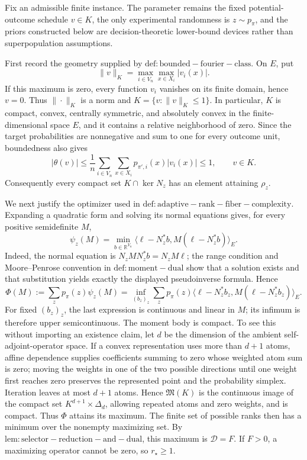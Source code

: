 Fix an admissible finite instance. The parameter remains the fixed potential-outcome schedule \(v\in K\), the only experimental randomness is \(z\sim p_{\pi}\), and the priors constructed below are decision-theoretic lower-bound devices rather than superpopulation assumptions.

First record the geometry supplied by \(\mathrm{def:bounded-fourier-class}\). On \(E\), put
\[
 \|v\|_K=\max_{i\in V_n}\max_{x\in X_i}|v_i(x)|.
\]
If this maximum is zero, every function \(v_i\) vanishes on its finite domain, hence \(v=0\). Thus \(\|\cdot\|_K\) is a norm and \(K=\{v:\|v\|_K\le1\}\). In particular, \(K\) is compact, convex, centrally symmetric, and absolutely convex in the finite-dimensional space \(E\), and it contains a relative neighborhood of zero. Since the target probabilities are nonnegative and sum to one for every outcome unit, boundedness also gives
\[
 |\theta(v)|
 \le \frac1n\sum_{i\in V_n}\sum_{x\in X_i}p_{\pi',i}(x)|v_i(x)|
 \le1,
 \qquad v\in K.
\]
Consequently every compact set \(K\cap\ker N_z\) has an element attaining \(\rho_z\).

We next justify the optimizer used in \(\mathrm{def:adaptive-rank-fiber-complexity}\). Expanding a quadratic form and solving its normal equations gives, for every positive semidefinite \(M\),
\[
 \psi_z(M)
 =\min_{b\in\mathbb R^{V_n}}
 \langle\ell-N_z^{\ast}b,M(\ell-N_z^{\ast}b)\rangle_E.
\]
Indeed, the normal equation is
\(N_zMN_z^{\ast}b=N_zM\ell\); the range condition and Moore--Penrose convention in \(\mathrm{def:moment-dual}\) show that a solution exists and that substitution yields exactly the displayed pseudoinverse formula. Hence
\[
 \Phi(M):=\sum_zp_{\pi}(z)\psi_z(M)
 =\inf_{(b_z)_z}\sum_zp_{\pi}(z)
 \langle\ell-N_z^{\ast}b_z,M(\ell-N_z^{\ast}b_z)\rangle_E.
\]
For fixed \((b_z)_z\), the last expression is continuous and linear in \(M\); its infimum is therefore upper semicontinuous. The moment body is compact. To see this without importing an existence claim, let \(d\) be the dimension of the ambient self-adjoint-operator space. If a convex representation uses more than \(d+1\) atoms, affine dependence supplies coefficients summing to zero whose weighted atom sum is zero; moving the weights in one of the two possible directions until one weight first reaches zero preserves the represented point and the probability simplex. Iteration leaves at most \(d+1\) atoms. Hence \(\mathfrak M(K)\) is the continuous image of the compact set \(K^{d+1}\times\Delta_d\), allowing repeated atoms and zero weights, and is compact. Thus \(\Phi\) attains its maximum. The finite set of possible ranks then has a minimum over the nonempty maximizing set. By \(\mathrm{lem:selector-reduction-and-dual}\), this maximum is \(\mathcal D=F\). If \(F>0\), a maximizing operator cannot be zero, so \(r_{\star}\ge1\).

